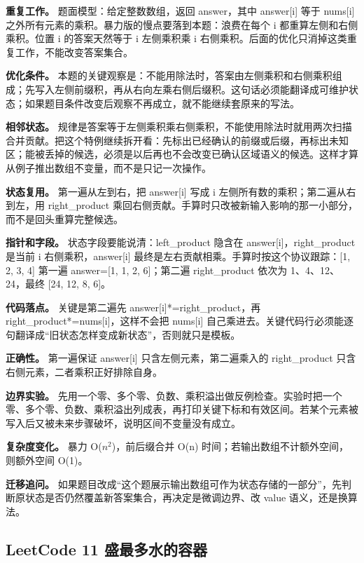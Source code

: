 \textbf{重复工作。} 题面模型：给定整数数组，返回 answer，其中 answer[i] 等于 nums[i] 之外所有元素的乘积。暴力版的慢点要落到本题：浪费在每个 i 都重算左侧和右侧乘积。位置 i 的答案天然等于 i 左侧乘积乘 i 右侧乘积。后面的优化只消掉这类重复工作，不能改变答案集合。

\textbf{优化条件。} 本题的关键观察是：不能用除法时，答案由左侧乘积和右侧乘积组成；先写入左侧前缀积，再从右向左乘右侧后缀积。这句话必须能翻译成可维护状态；如果题目条件改变后观察不再成立，就不能继续套原来的写法。

\textbf{相邻状态。} 规律是答案等于左侧乘积乘右侧乘积，不能使用除法时就用两次扫描合并贡献。把这个特例继续拆开看：先标出已经确认的前缀或后缀，再标出未知区；能被丢掉的候选，必须是以后再也不会改变已确认区域语义的候选。这样才算从例子推出数组不变量，而不是只记一次操作。

\textbf{状态复用。} 第一遍从左到右，把 answer[i] 写成 i 左侧所有数的乘积；第二遍从右到左，用 right\_product 乘回右侧贡献。手算时只改被新输入影响的那一小部分，而不是回头重算完整候选。

\textbf{指针和字段。} 状态字段要能说清：left\_product 隐含在 answer[i]，right\_product 是当前 i 右侧乘积，answer[i] 最终是左右贡献相乘。手算时按这个协议跟踪：[1, 2, 3, 4] 第一遍 answer=[1, 1, 2, 6]；第二遍 right\_product 依次为 1、4、12、24，最终 [24, 12, 8, 6]。

\textbf{代码落点。} 关键是第二遍先 answer[i]*=right\_product，再 right\_product*=nums[i]，这样不会把 nums[i] 自己乘进去。关键代码行必须能逐句翻译成“旧状态怎样变成新状态”，否则就只是模板。

\textbf{正确性。} 第一遍保证 answer[i] 只含左侧元素，第二遍乘入的 right\_product 只含右侧元素，二者乘积正好排除自身。

\textbf{边界实验。} 先用一个零、多个零、负数、乘积溢出做反例检查。实验时把一个零、多个零、负数、乘积溢出列成表，再打印关键下标和有效区间。若某个元素被写入后又被未来步骤破坏，说明区间不变量没有成立。

\textbf{复杂度变化。} 暴力 O(\ensuremath{n^{2}})，前后缀合并 O(n) 时间；若输出数组不计额外空间，则额外空间 O(1)。

\textbf{迁移追问。} 如果题目改成“这个题展示输出数组可作为状态存储的一部分”，先判断原状态是否仍然覆盖新答案集合，再决定是微调边界、改 value 语义，还是换算法。

\subsection{LeetCode 11 盛最多水的容器}

